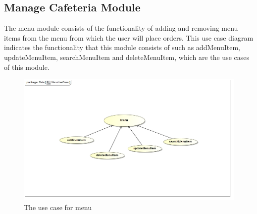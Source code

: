 \documentclass[a4paper,12pt]{report}
\begin{document}
\subsection{Manage Cafeteria Module}

The menu module consists of the functionality of adding and removing menu items from the menu from which the user will place orders. This use case diagram indicates the functionality that this module consists of such as addMenuItem, updateMenuItem, searchMenuItem and deleteMenuItem, which are the use cases of this module.

\begin{figure}[H]
  \centering
    \includegraphics[width=1.0\textwidth]{../images/MenuUseCase.jpg}
    \caption{The use case for menu} 
\end{figure}
\end{document}

